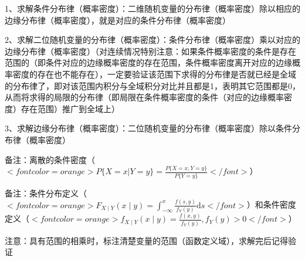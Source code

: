 1、求解条件分布律（概率密度）：二维随机变量的分布律（概率密度）除以相应的边缘分布律（概率密度），就是对应的条件分布律（概率密度）

2、求解二位随机变量的分布律（概率密度）：条件分布律（概率密度）乘以对应的边缘分布律（概率密度）（对连续情况特别注意：如果条件概率密度的条件是存在范围的（即条件对应的边缘概率密度的存在范围，条件概率密度离开对应的边缘概率密度的存在也不能存在），一定要验证该范围下求得的分布律是否就已经是全域的分布律了，即对该范围内积分与全域积分对比并且都是1，表明其它范围都是0，从而将求得的局限的分布律（即局限在条件概率密度的条件（对应的边缘概率密度）存在范围）推广到全域上）

3、求解边缘分布律（概率密度）：二位随机变量的分布律（概率密度）除以条件分布律（概率密度）

备注：离散的条件密度（$ <font color=orange>P\{X=x|Y=y\} = \frac {P\{X=x,Y=y\}}{P\{Y=y\}}</font> $）

备注：条件分布定义（$ <font color=orange>F_{X \mid Y}(x \mid y)=\int_{-\infty}^{x} \frac{f(s, y)}{f_{Y}(y)} \mathrm{d} s</font> $）和条件密度定义（$ <font color=orange>f_{X \mid Y}(x \mid y)=\frac{f(x, y)}{f_{Y}(y)}, f_{Y}(y)>0</font> $）

注意：具有范围的相乘时，标注清楚变量的范围（函数定义域），求解完后记得验证

